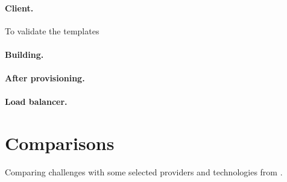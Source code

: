 \paragraph{Client.}


To validate the templates 

\paragraph{Building.}


\paragraph{After provisioning.}



\paragraph{Load balancer.}



\section{Comparisons}


Comparing challenges with some selected providers and technologies from .
